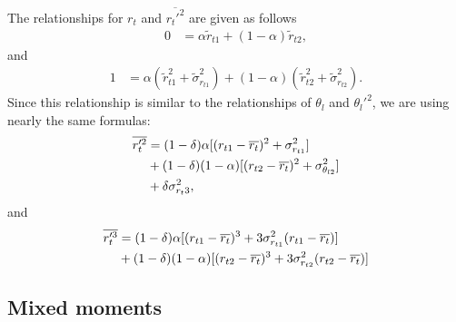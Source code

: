 The relationships for $r_t$ and $\overline{r_t'^2}$ are given as follows
\begin{align}
    \label{eq:rt_bar_nondim}
    0 &= \alpha \tilde{r}_{t1} + (1 - \alpha) \tilde{r}_{t2},
\end{align}
and
\begin{align}
    \label{rtptwo_nondim}
    1 &= \alpha \left( \tilde{r}_{t1}^2 + \tilde{\sigma}_{r_{t1}}^2 \right) +
    (1 - \alpha) \left( \tilde{r}_{t2}^2 + \tilde{\sigma}_{r_{t2}}^2 \right).
\end{align}
Since this relationship is similar to the relationships of $\theta_l$ and $\theta_l'^2$,
we are using nearly the same formulas:
\begin{align}
    \label{eq:r_t_prime_2_bar}
    \overline{r_t'^2}
    &= (1 - \delta) \alpha [(r_{t1} - \overline{r_t})^2 + \sigma_{r_{t1}}^2] \nonumber\\
    &+ (1 - \delta) (1 - \alpha) [(r_{t2} - \overline{r_t})^2 + \sigma_{\theta_{l2}}^2] \nonumber\\
    &+ \delta \sigma_{r_t 3}^2,
\end{align}
and
\begin{align}
    \label{eq:r_t_prime_3_bar}
    \overline{r_t'^3}
    &= (1 - \delta) \alpha [(r_{t1} - \overline{r_t})^3 + 3 \sigma_{r_{t1}}^2 (r_{t1} - \overline{r_t})] \nonumber\\
    &+ (1 - \delta) (1 - \alpha) [(r_{t2} - \overline{r_t})^3 + 3 \sigma_{r_{t2}}^2 (r_{t2} - \overline{r_t})]
\end{align}

\subsection{Mixed moments}\label{subsec:lowerordermoments_mixed}


